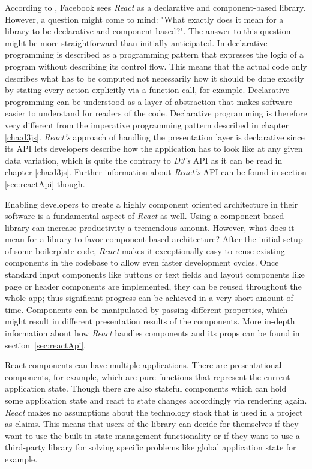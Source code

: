 According to \cite{React}, Facebook sees \emph{React} as a declarative and component-based library. However, a question might come to mind: "What exactly does it mean for a library to be declarative and component-based?". The answer to this question might be more straightforward than initially anticipated. In \cite{lloyd1994practical} declarative programming is described as a programming pattern that expresses the logic of a program without describing its control flow. This means that the actual code only describes what has to be computed not necessarily how it should be done exactly by stating every action explicitly via a function call, for example. Declarative programming can be understood as a layer of abstraction that makes software easier to understand for readers of the code. Declarative programming is therefore very different from the imperative programming pattern described in chapter \ref{cha:d3js}. \emph{React's} approach of handling the presentation layer is declarative since its API lets developers describe how the application has to look like at any given data variation, which is quite the contrary to \emph{D3's} API as it can be read in chapter \ref{cha:d3js}. Further information about \emph{React's} API can be found in section \ref{sec:reactApi} though.

Enabling developers to create a highly component oriented architecture in their software is a fundamental aspect of \emph{React} as well. Using a component-based library can increase productivity a tremendous amount. However, what does it mean for a library to favor component based architecture? After the initial setup of some boilerplate code, \emph{React} makes it exceptionally easy to reuse existing components in the codebase to allow even faster development cycles. Once standard input components like buttons or text fields and layout components like page or header components are implemented, they can be reused throughout the whole app; thus significant progress can be achieved in a very short amount of time. Components can be manipulated by passing different properties, which might result in different presentation results of the components. More in-depth information about how \emph{React} handles components and its props can be found in section~\ref{sec:reactApi}.

React components can have multiple applications. There are presentational components, for example, which are pure functions that represent the current application state. Though there are also stateful components which can hold some application state and react to state changes accordingly via rendering again. \emph{React} makes no assumptions about the technology stack that is used in a project as \cite{React} claims. This means that users of the library can decide for themselves if they want to use the built-in state management functionality or if they want to use a third-party library for solving specific problems like global application state for example.

